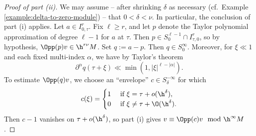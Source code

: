 \begin{proof}[Proof of part (ii)]
  We may assume -- after shrinking $\delta$ as necessary (cf.\ Example \ref{example:delta-to-zero-module}) -- that $0 < \delta < \nu$.  In particular, the conclusion of part (i) applies.  Let $a \in I_{0,\tau}^r$.  Fix $\ell \geq r$, and let $p$ denote the Taylor polynomial approximation of degree $\ell-1$ for $a$ at $\tau$.  Then $p \in S^{\ell-1}_0 \cap I_{\tau,0}^r$, so by hypothesis, $\Opp(p) v \in \h^{r \nu} M$.  Set $q := a - p$.  Then $q \in S^\infty_0$.  Moreover, for $\xi \ll 1$ and each fixed multi-index $\alpha$, we have by Taylor's theorem
  \begin{equation}\label{eq:cuhmwsku3k}
    \partial^\alpha q(\tau + \xi) \ll \min(1, |\xi|^{\ell-|\alpha|}).
  \end{equation}
  To estimate $\Opp(q) v$, we choose an ``envelope'' $c \in S^{-\infty}_\delta$ for which
  \begin{equation*}
    c(\xi) = \begin{cases}
      1 & \text{ if } \xi = \tau + o(\h^\delta), \\
      0 &  \text{ if } \xi \neq \tau + \O(\h^\delta).
    \end{cases}
  \end{equation*}
  Then $c-1$ vanishes on $\tau + o(\h^\delta)$, so part (i) gives $v \equiv \Opp(c) v \mod{\h^\infty M}$.


\end{proof}
